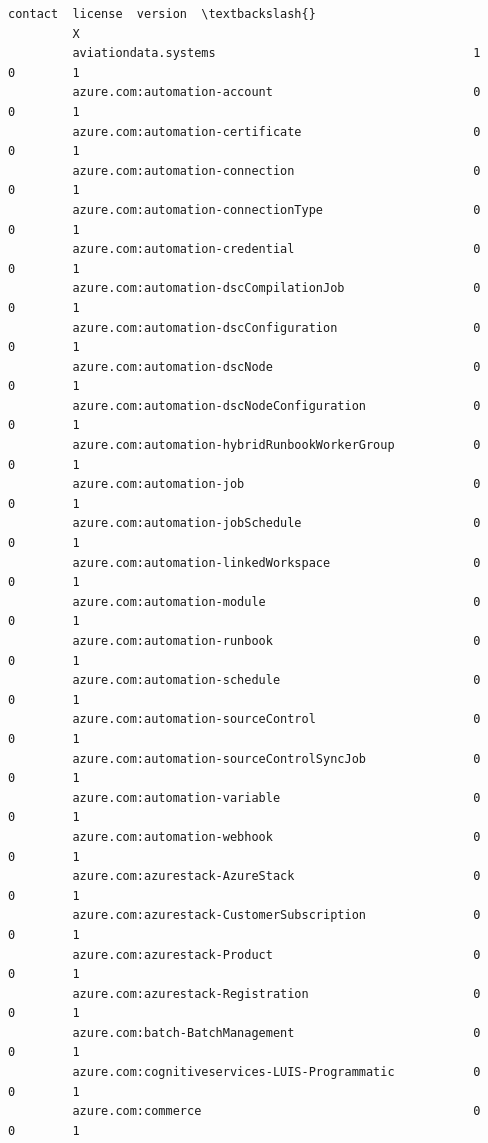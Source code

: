 \documentclass[11pt]{article}
\begin{document}
\begin{Verbatim}[commandchars=\\\{\}]
                                                           contact  license  version  \textbackslash{}
         X                                                                             
         aviationdata.systems                                    1        0        1   
         azure.com:automation-account                            0        0        1   
         azure.com:automation-certificate                        0        0        1   
         azure.com:automation-connection                         0        0        1   
         azure.com:automation-connectionType                     0        0        1   
         azure.com:automation-credential                         0        0        1   
         azure.com:automation-dscCompilationJob                  0        0        1   
         azure.com:automation-dscConfiguration                   0        0        1   
         azure.com:automation-dscNode                            0        0        1   
         azure.com:automation-dscNodeConfiguration               0        0        1   
         azure.com:automation-hybridRunbookWorkerGroup           0        0        1   
         azure.com:automation-job                                0        0        1   
         azure.com:automation-jobSchedule                        0        0        1   
         azure.com:automation-linkedWorkspace                    0        0        1   
         azure.com:automation-module                             0        0        1   
         azure.com:automation-runbook                            0        0        1   
         azure.com:automation-schedule                           0        0        1   
         azure.com:automation-sourceControl                      0        0        1   
         azure.com:automation-sourceControlSyncJob               0        0        1   
         azure.com:automation-variable                           0        0        1   
         azure.com:automation-webhook                            0        0        1   
         azure.com:azurestack-AzureStack                         0        0        1   
         azure.com:azurestack-CustomerSubscription               0        0        1   
         azure.com:azurestack-Product                            0        0        1   
         azure.com:azurestack-Registration                       0        0        1   
         azure.com:batch-BatchManagement                         0        0        1   
         azure.com:cognitiveservices-LUIS-Programmatic           0        0        1   
         azure.com:commerce                                      0        0        1   

\end{Verbatim}
\end{document}

